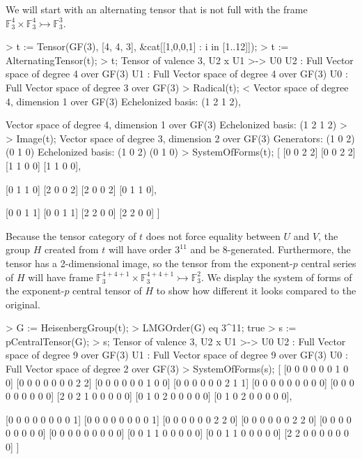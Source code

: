 \begin{example}[PGroupsHalfFull]

We will start with an alternating tensor that is not full with the frame $\mathbb{F}_3^4\times\mathbb{F}_3^4\rightarrowtail \mathbb{F}_3^3$.
\begin{code}
> t := Tensor(GF(3), [4, 4, 3], &cat[[1,0,0,1] : i in [1..12]]);
> t := AlternatingTensor(t);
> t;
Tensor of valence 3, U2 x U1 >-> U0
U2 : Full Vector space of degree 4 over GF(3)
U1 : Full Vector space of degree 4 over GF(3)
U0 : Full Vector space of degree 3 over GF(3)
> Radical(t);
<
    Vector space of degree 4, dimension 1 over GF(3)
    Echelonized basis:
    (1 2 1 2),

    Vector space of degree 4, dimension 1 over GF(3)
    Echelonized basis:
    (1 2 1 2)
>
> Image(t);
Vector space of degree 3, dimension 2 over GF(3)
Generators:
(1 0 2)
(0 1 0)
Echelonized basis:
(1 0 2)
(0 1 0)
> SystemOfForms(t);
[
    [0 0 2 2]
    [0 0 2 2]
    [1 1 0 0]
    [1 1 0 0],

    [0 1 1 0]
    [2 0 0 2]
    [2 0 0 2]
    [0 1 1 0],

    [0 0 1 1]
    [0 0 1 1]
    [2 2 0 0]
    [2 2 0 0]
]
\end{code}

Because the tensor category of $t$ does not force equality between $U$ and $V$, the group $H$ created from $t$ will have order $3^{11}$ and be 8-generated. 
Furthermore, the tensor has a 2-dimensional image, so the tensor from the exponent-$p$ central series of $H$ will have frame $\mathbb{F}_3^{4+4+1}\times \mathbb{F}_3^{4+4+1}\rightarrowtail\mathbb{F}_3^2$. 
We display the system of forms of the exponent-$p$ central tensor of $H$ to show how different it looks compared to the original. 
\begin{code}
> G := HeisenbergGroup(t);
> LMGOrder(G) eq 3^11;
true
> s := pCentralTensor(G);
> s;
Tensor of valence 3, U2 x U1 >-> U0
U2 : Full Vector space of degree 9 over GF(3)
U1 : Full Vector space of degree 9 over GF(3)
U0 : Full Vector space of degree 2 over GF(3)
> SystemOfForms(s);
[
    [0 0 0 0 0 0 1 0 0]
    [0 0 0 0 0 0 0 2 2]
    [0 0 0 0 0 0 1 0 0]
    [0 0 0 0 0 0 2 1 1]
    [0 0 0 0 0 0 0 0 0]
    [0 0 0 0 0 0 0 0 0]
    [2 0 2 1 0 0 0 0 0]
    [0 1 0 2 0 0 0 0 0]
    [0 1 0 2 0 0 0 0 0],

    [0 0 0 0 0 0 0 0 1]
    [0 0 0 0 0 0 0 0 1]
    [0 0 0 0 0 0 2 2 0]
    [0 0 0 0 0 0 2 2 0]
    [0 0 0 0 0 0 0 0 0]
    [0 0 0 0 0 0 0 0 0]
    [0 0 1 1 0 0 0 0 0]
    [0 0 1 1 0 0 0 0 0]
    [2 2 0 0 0 0 0 0 0]
]
\end{code}
\end{example}
